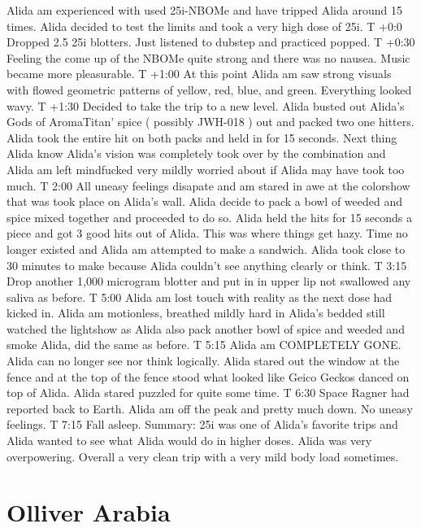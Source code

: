 \documentclass[12pt]{book}
\begin{document}
Alida am experienced with used 25i-NBOMe and have tripped Alida around 15 times. Alida decided to test the limits and took a very high dose of 25i. T +0:0 Dropped 2.5 25i blotters. Just listened to dubstep and practiced popped. T +0:30 Feeling the come up of the NBOMe quite strong and there was no nausea. Music became more pleasurable. T +1:00 At this point Alida am saw strong visuals with flowed geometric patterns of yellow, red, blue, and green. Everything looked wavy. T +1:30 Decided to take the trip to a new level. Alida busted out Alida's Gods of AromaTitan' spice ( possibly JWH-018 ) out and packed two one hitters. Alida took the entire hit on both packs and held in for 15 seconds. Next thing Alida know Alida's vision was completely took over by the combination and Alida am left mindfucked very mildly worried about if Alida may have took too much. T 2:00 All uneasy feelings disapate and am stared in awe at the colorshow that was took place on Alida's wall. Alida decide to pack a bowl of weeded and spice mixed together and proceeded to do so. Alida held the hits for 15 seconds a piece and got 3 good hits out of Alida. This was where things get hazy. Time no longer existed and Alida am attempted to make a sandwich. Alida took close to 30 minutes to make because Alida couldn't see anything clearly or think. T 3:15 Drop another 1,000 microgram blotter and put in in upper lip not swallowed any saliva as before. T 5:00 Alida am lost touch with reality as the next dose had kicked in. Alida am motionless, breathed mildly hard in Alida's bedded still watched the lightshow as Alida also pack another bowl of spice and weeded and smoke Alida, did the same as before. T 5:15 Alida am COMPLETELY GONE. Alida can no longer see nor think logically. Alida stared out the window at the fence and at the top of the fence stood what looked like Geico Geckos danced on top of Alida. Alida stared puzzled for quite some time. T 6:30 Space Ragner had reported back to Earth. Alida am off the peak and pretty much down. No uneasy feelings. T 7:15 Fall asleep. Summary: 25i was one of Alida's favorite trips and Alida wanted to see what Alida would do in higher doses. Alida was very overpowering. Overall a very clean trip with a very mild body load sometimes.



\chapter{Olliver Arabia}
\end{document}
